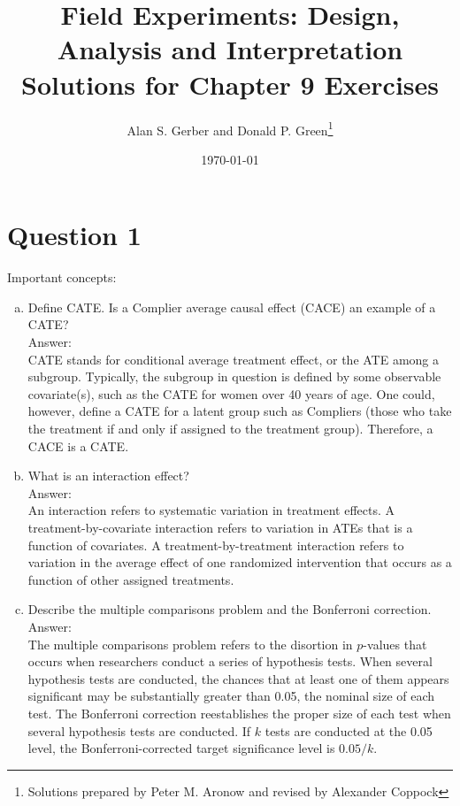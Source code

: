 \documentclass[11pt,notitlepage]{article}\usepackage[]{graphicx}\usepackage[]{color}
\title{Field Experiments: Design, Analysis and Interpretation \\
Solutions for Chapter 9 Exercises}
\author{Alan S. Gerber and Donald P. Green\footnote{Solutions prepared by Peter M. Aronow and revised by Alexander Coppock}}
\date{\today}
\begin{document}
\maketitle


\section*{Question 1}
Important concepts:

\begin{enumerate}[a)]
\item Define CATE. Is a Complier average causal effect (CACE) an example of a CATE?\\
Answer:\\
CATE stands for conditional average treatment effect, or the ATE among a subgroup. Typically, the subgroup in question is defined by some observable covariate(s), such as the CATE for women over 40 years of age. One could, however, define a CATE for a latent group such as Compliers (those who take the treatment if and only if assigned to the treatment group). Therefore, a CACE is a CATE.

\item What is an interaction effect?\\
Answer:\\
An interaction refers to systematic variation in treatment effects. A treatment-by-covariate interaction refers to variation in ATEs that is a function of covariates. A treatment-by-treatment interaction refers to variation in the average effect of one randomized intervention that occurs as a function of other assigned treatments.

\item Describe the multiple comparisons problem and the Bonferroni correction.\\
Answer:\\
The multiple comparisons problem refers to the disortion in $p$-values that occurs when researchers conduct a series of hypothesis tests. When several hypothesis tests are conducted, the chances that at least one of them appears significant may be substantially greater than 0.05, the nominal size of each test. The Bonferroni correction reestablishes the proper size of each test when several hypothesis tests are conducted.   If $k$ tests are conducted at the 0.05 level, the Bonferroni-corrected target significance level is $0.05/k$.
\end{enumerate}
\end{document}
